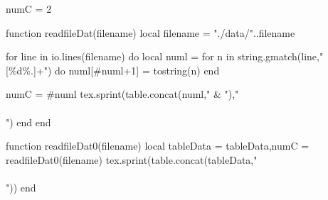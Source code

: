  
 
\usepackage{luacode} %
 
\begin{luacode}
numC = 2
 
function readfileDat(filename)
    local filename = "./data/"..filename
 
    for line in io.lines(filename) do
        local numl = {}
        for n in string.gmatch(line,"[\%d\%.]+") do
            numl[#numl+1] = tostring(n)
        end

        numC = #numl
        tex.sprint(table.concat(numl," & "),"\\\\")
    end
end
 
function readfileDat0(filename)
    local tableData = {}
    tableData,numC = readfileDat0(filename)
    tex.sprint(table.concat(tableData,"\\\\"))
end
 
\end{luacode}
 
\newcommand{\luaTable}[5][\directlua{tex.print(numC)}]
{
\begin{table}[H]
\centering
\label{#5}
\caption{#3}
\begin{tabular}{*{#1}{c}}
\hline
#4\\
\hline
\directlua{readfileDat('#2')}
\hline
\end{tabular}
\end{table}
}
 
 
 
\setcounter{cGraph}{1}
\newcommand{\plotedFigure}[2][\thecGraph]{
\begin{figure}[H]
\centering
\label{fig:g#1}
\texttt{[image: ../image/graph\#1.png]}
\caption{#2}
\end{figure}
\stepcounter{cGraph}
}
 
